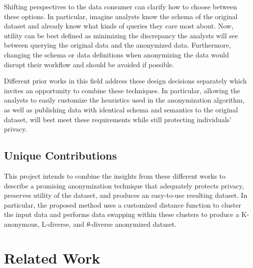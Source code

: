Shifting perspectives to the data consumer can clarify how to choose between these options. In particular, imagine analysts know the schema of the original dataset and already know what kinds of queries they care most about. Now, utility can be best defined as minimizing the discrepancy the analysts will see between querying the original data and the anonymized data. Furthermore, changing the schema or data definitions when anonymizing the data would disrupt their workflow and should be avoided if possible.

Different prior works in this field address these design decisions separately which invites an opportunity to combine these techniques. In particular, allowing the analysts to easily customize the heuristics used in the anonymization algorithm, as well as publishing data with identical schema and semantics to the original dataset, will best meet these requirements while still protecting individuals' privacy.


\subsection{Unique Contributions}
This project intends to combine the insights from these different works to describe a promising anonymization technique that adequately protects privacy, preserves utility of the dataset, and produces an easy-to-use resulting dataset. In particular, the proposed method uses a customized distance function\cite{jiaPad} to cluster the input data and performs data swapping\cite{soriaSwapping} within these clusters to produce a K-anonymous, L-diverse\cite{machanavajjhalalDiversity}, and $\theta$-diverse anonymized dataset.

\section{Related Work}
